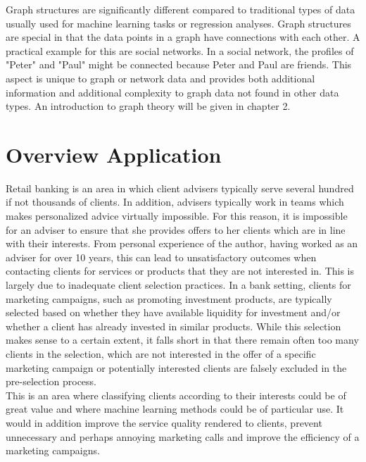 	\noindent Graph structures are significantly different compared to
	traditional types of data usually used for machine learning tasks or
	regression analyses. Graph structures are special in that the data points
	in a graph have connections with each other. A practical example for this
	are social networks. In a social network, the profiles of "Peter" and
	"Paul" might be connected because Peter and Paul are friends. This aspect
	is unique to graph or network data and provides both additional information
	and additional complexity to graph data not found in other data types. An
	introduction to graph theory will be given in chapter 2. 



	\section{Overview Application}

	Retail banking is an area in which client advisers typically serve several 
	hundred if not thousands of clients. In addition, advisers typically work
	in teams which makes personalized advice virtually impossible. For this 
	reason, it is impossible for an adviser to ensure that she provides offers
	to her clients which are in line with their interests. From personal
	experience of the author, having worked as an adviser for over 10 years, 
	this can lead to unsatisfactory outcomes when contacting clients for services or 
	products that they are not interested in. This is largely due to inadequate
	client selection practices. In a bank setting, clients for marketing 
	campaigns, such as promoting investment products, are typically selected based
	on whether they have available liquidity for investment and/or whether a 
	client has already invested in similar products. While this selection makes
	sense to a certain extent, it falls short in that there remain often too 
	many clients in the selection, which are not interested in the offer of a 
	specific marketing campaign or potentially interested clients are falsely 
	excluded in the pre-selection process. \\
	

	\noindent This is an area where classifying clients according to their 
	interests could be of great value and where machine learning methods could 
	be of particular use. It would in addition improve the service quality 
	rendered to clients, prevent unnecessary and perhaps annoying marketing 
	calls and improve the efficiency of a marketing campaigns.
	

